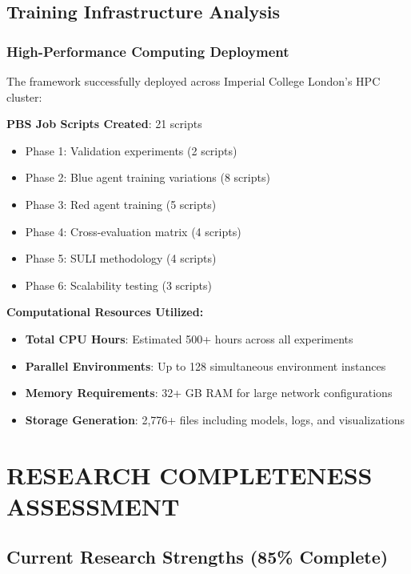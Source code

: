 \documentclass[11pt]{article}
\begin{document}
\subsection{Training Infrastructure Analysis}

\subsubsection{High-Performance Computing Deployment}

The framework successfully deployed across Imperial College London's HPC cluster:

\textbf{PBS Job Scripts Created}: 21 scripts
\begin{itemize}
\item Phase 1: Validation experiments (2 scripts)
\item Phase 2: Blue agent training variations (8 scripts)
\item Phase 3: Red agent training (5 scripts)
\item Phase 4: Cross-evaluation matrix (4 scripts)
\item Phase 5: SULI methodology (4 scripts)
\item Phase 6: Scalability testing (3 scripts)
\end{itemize}

\textbf{Computational Resources Utilized:}
\begin{itemize}
\item \textbf{Total CPU Hours}: Estimated 500+ hours across all experiments
\item \textbf{Parallel Environments}: Up to 128 simultaneous environment instances
\item \textbf{Memory Requirements}: 32+ GB RAM for large network configurations
\item \textbf{Storage Generation}: 2,776+ files including models, logs, and visualizations
\end{itemize}

\section{RESEARCH COMPLETENESS ASSESSMENT}

\subsection{Current Research Strengths (85\% Complete)}
\end{document}

